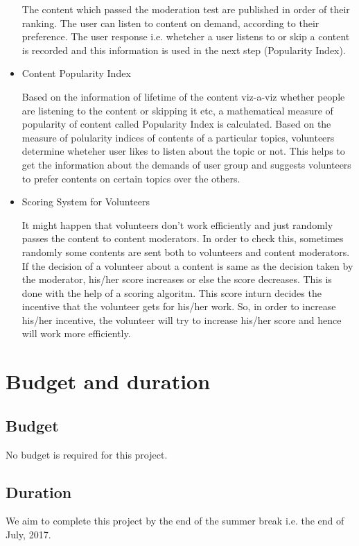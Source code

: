 \documentclass[11pt]{article}
\begin{document}
\begin{itemize}
			The content which passed the moderation test are published in order of their ranking. The user can listen to content on demand, according to their preference. The user response i.e. wheteher a user listens to or skip a content is recorded and this information is used in the next step (Popularity Index).


			\item Content Popularity Index


			Based on the information of lifetime of the content viz-a-viz whether people are listening to the content or skipping it etc, a mathematical measure of popularity of content called Popularity Index is calculated. Based on the measure of polularity indices of contents of a particular topics, volunteers determine wheteher user likes to listen about the topic or not. This helps to get the information about the demands of user group and suggests volunteers to prefer contents on certain topics over the others.


			\item Scoring System for Volunteers


			It might happen that volunteers don't work efficiently and just randomly passes the content to content moderators. In order to check this, sometimes randomly some contents are sent both to volunteers and content moderators. If the decision of a volunteer about a content is same as the decision taken by the moderator, his/her score increases or else the score decreases. This is done with the help of a scoring algoritm. This score inturn decides the incentive that the volunteer gets for his/her work. So, in order to increase his/her incentive, the volunteer will try to increase his/her score and hence will work more efficiently.


		\end{itemize}


	\section{Budget and duration}	
		\subsection{Budget}
			No budget is required for this project.			
					
		\subsection{Duration}
			We aim to complete this project by the end of the summer break i.e. the end of July, 2017. 
\end{document}
